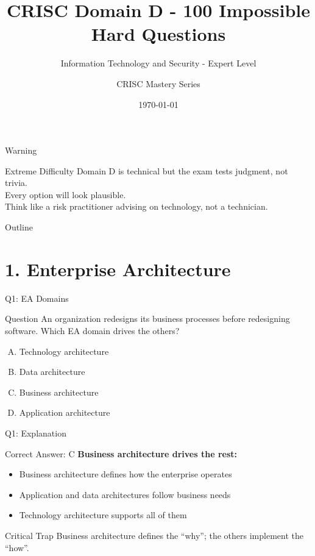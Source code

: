 \documentclass{beamer}
\title{CRISC Domain D - 100 Impossible Hard Questions}
\subtitle{Information Technology and Security - Expert Level}
\author{CRISC Mastery Series}
\date{\today}
\begin{document}
	
	\begin{frame}
		\titlepage
	\end{frame}
	
	\begin{frame}{Warning}
		\begin{alertblock}{Extreme Difficulty}
			Domain D is technical but the exam tests judgment, not trivia.\\
			Every option will look plausible.\\
			Think like a risk practitioner advising on technology, not a technician.
		\end{alertblock}
	\end{frame}
	
	\begin{frame}{Outline}
		\tableofcontents
	\end{frame}
	
	\section{1. Enterprise Architecture}
	
	\begin{frame}{Q1: EA Domains}
		\begin{block}{Question}
			An organization redesigns its business processes before redesigning software. Which EA domain drives the others?
		\end{block}
		\begin{enumerate}[(A)]
			\item Technology architecture
			\item Data architecture
			\item Business architecture
			\item Application architecture
		\end{enumerate}
	\end{frame}
	
	\begin{frame}{Q1: Explanation}
		\begin{block}{Correct Answer: C}
			\textbf{Business architecture drives the rest:}
			\begin{itemize}
				\item Business architecture defines how the enterprise operates
				\item Application and data architectures follow business needs
				\item Technology architecture supports all of them
			\end{itemize}
		\end{block}
		\begin{alertblock}{Critical Trap}
			Business architecture defines the ``why''; the others implement the ``how''.
		\end{alertblock}
	\end{frame}
	
\end{document}
